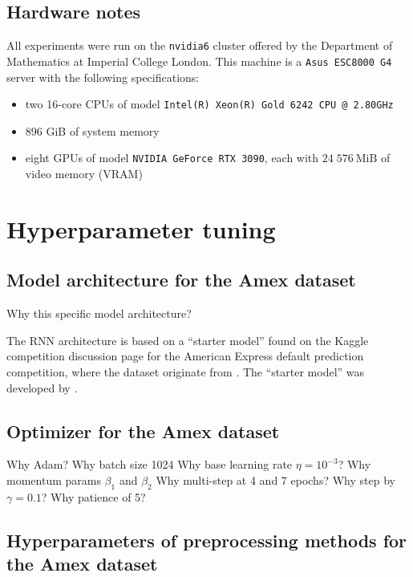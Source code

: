 \documentclass{statsmsc}
\begin{document}
{\section{Hardware notes}%
\label{sec:Hardware notes}

All experiments were run on the \texttt{nvidia6} cluster offered by the Department of Mathematics
at Imperial College London. This machine is a \texttt{Asus ESC8000 G4} server with the following
specifications:
\begin{itemize}
    \item two 16-core CPUs of model \texttt{Intel(R) Xeon(R) Gold 6242 CPU @ 2.80GHz}
    \item 896 GiB of system memory
    \item eight GPUs of model \texttt{NVIDIA GeForce RTX 3090}, each with
        $24\;576~\textrm{MiB}$ of video memory (VRAM)
\end{itemize}


\chapter{Hyperparameter tuning}%
\label{cha:Hyperparameter tuning}

\section{Model architecture for the Amex dataset}%
\label{sec:hyp_amex_mod}

Why this specific model architecture?


The \ac{RNN} architecture is based on a ``starter model'' found on the Kaggle competition
discussion page for the American Express default prediction competition, where the dataset
originate from \cite{amex-data}. The ``starter model'' was developed by \cite{amex-starter}.

\section{Optimizer for the Amex dataset}%
\label{sec:hyp_amex_opt}


Why Adam? Why batch size 1024
Why base learning rate $\eta=10^{-3}$? Why momentum params $\beta_1$ and $\beta_2$
Why multi-step at 4 and 7 epochs? Why step by $\gamma=0.1$?
Why patience of 5?



\section{Hyperparameters of preprocessing methods for the Amex dataset}%
\label{sec:hyp_amex_prep}

}
\end{document}
